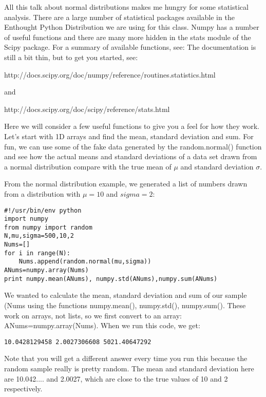 {All this talk about normal distributions makes me hungry for some statistical analysis.  
There are a large number of statistical packages available in the Enthought Python Distribution we are using for this class.  Numpy has a number of useful functions and there are many more hidden in the  {\color{blue}stats} module of the Scipy package.  For a summary of available functions, see:  
The documentation is still a bit thin, but to get you started, see:

http://docs.scipy.org/doc/numpy/reference/routines.statistics.html

and

http://docs.scipy.org/doc/scipy/reference/stats.html

Here we will consider a few  useful functions to give you a feel for how they work.  Let's start with 1D arrays and find the mean, standard deviation and sum.  For fun, we can use some of the fake data generated by the random.normal() function and see how the  actual means and standard deviations of a data set drawn from a normal distribution compare with the  true mean of $\mu$ and standard deviation $\sigma$.  

From the normal distribution example, we generated a list of numbers drawn from a distribution with $\mu=10$ and $sigma=2$:

{\color{blue}\begin{verbatim}
#!/usr/bin/env python
import numpy
from numpy import random
N,mu,sigma=500,10,2
Nums=[]
for i in range(N):
    Nums.append(random.normal(mu,sigma))
ANums=numpy.array(Nums)
print numpy.mean(ANums), numpy.std(ANums),numpy.sum(ANums)
\end{verbatim}}

\noindent
We wanted to calculate the mean, standard deviation and sum of our sample ({\color{blue}Nums} using the functions {\color{blue}numpy.mean(), numpy.std(), numpy.sum()}.  These work on arrays, not lists, so we first convert to an array:  {\color{blue}ANums=numpy.array(Nums)}.   When we run this code, we get:

{\color{blue}\begin{verbatim}
10.0428129458 2.0027306608 5021.40647292
\end{verbatim}}

\noindent Note that you will get a different answer every time you run this because the random sample really is pretty random.  The mean and standard deviation here are 10.042....  and 2.0027, which are close to the true values of 10 and 2 respectively.  

}
